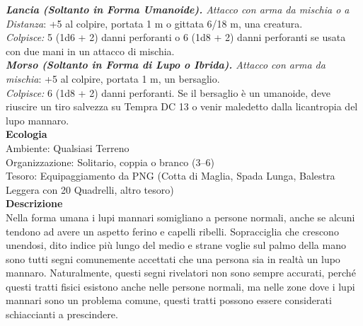 \begin{multicols}{2}
\emph{\textbf{Lancia (Soltanto in Forma Umanoide).} Attacco con arma da mischia o a Distanza}: +5 al colpire, portata 1 m o gittata 6/18 m, una creatura.\\

\emph{Colpisce:} 5 (1d6 + 2) danni perforanti o 6 (1d8 + 2) danni perforanti se usata con due mani in un attacco di mischia.\\

\emph{\textbf{Morso (Soltanto in Forma di Lupo o Ibrida).} Attacco con arma da mischia}: +5 al colpire, portata 1 m, un bersaglio.\\
\emph{Colpisce:} 6 (1d8 + 2) danni perforanti. Se il bersaglio è un umanoide, deve riuscire un tiro salvezza su Tempra DC  13 o venir maledetto dalla licantropia del lupo mannaro.\\
\textbf{Ecologia}\\
Ambiente: Qualsiasi Terreno\\
Organizzazione: Solitario, coppia o branco (3–6)\\
Tesoro: Equipaggiamento da PNG (Cotta di Maglia, Spada Lunga, Balestra Leggera con 20 Quadrelli, altro tesoro)\\
\textbf{Descrizione}\\
Nella forma umana i lupi mannari somigliano a persone normali, anche se alcuni tendono ad avere un aspetto ferino e capelli ribelli. Sopracciglia che crescono unendosi, dito indice più lungo del medio e strane voglie sul palmo della mano sono tutti segni comunemente accettati che una persona sia in realtà un lupo mannaro. Naturalmente, questi segni rivelatori non sono sempre accurati, perché questi tratti fisici esistono anche nelle persone normali, ma nelle zone dove i lupi mannari sono un problema comune, questi tratti possono essere considerati schiaccianti a prescindere.\\


\end{multicols}
